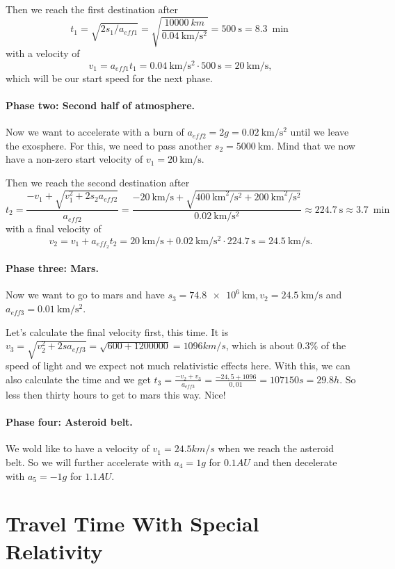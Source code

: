 \documentclass[10pt]{article}
\numberwithin{equation}{section}
\begin{document}
	Then we reach the first destination after	
	\begin{equation}
		t_1 = \sqrt{2s_1/a_{eff1}} = \sqrt{\frac{\SI{10000}{km}}{\SI{0.04}{\km\per\s\squared}}} = \SI{500}{\s} = \SI{8.3}{\min}	\end{equation}	
	with a velocity of
	\begin{equation}
		v_1=a_{eff1}t_1=\SI{0.04}{\km\per\s\squared} \cdot \SI{500}{\s} = \SI{20}{\km\per\s}, \end{equation}	
	which will be our start speed for the next phase.
	
	\paragraph{Phase two: Second half of atmosphere.}
	Now we want to accelerate with a burn of $a_{eff2}=2g=\SI{0.02}{\km\per\s\squared}$ until we leave the exosphere. For this, we need to pass another $s_2=\SI{5000}{\km}$. Mind that we now have a non-zero start velocity of $v_1 = \SI{20}{\km\per\s}$.
	
	Then we reach the second destination after
	\begin{equation}
		t_2 = \frac{-v_1+\sqrt{v^2_1+2s_2a_{eff2}}}{a_{eff2}} = \frac {\SI{-20}{\km\per\s}+\sqrt{\SI{400}{\km\squared\per\s\squared}+\SI{200}{\km\squared\per\s\squared}}} {\SI{0.02}{\km\per\s\squared}}
		\approx \SI{224.7}{\s} \approx \SI{3.7}{\min} \end{equation}
	with a final velocity of
	\begin{equation}
		v_2 = v_1 + a_{eff_2}t_2
		= \SI{20}{\km\per\s} + \SI{0.02}{\km\per\s\squared} \cdot \SI{224.7}{\s}
		= \SI{24.5}{\km\per\s}. \end{equation}
	
	\paragraph{Phase three: Mars.}	
	Now we want to go to mars and have $s_3 = \SI{74.8e+6}{\km}, v_2 = \SI{24.5}{\km\per\s}$ and $a_{eff3} = \SI{0.01}{\km\per\s\squared}$.
	
	Let's calculate the final velocity first, this time. It is $v_3 = \sqrt{v^2_2 + 2sa_{eff3}} = \sqrt{600 + 1 200 000} = 1096 km/s$, which is about $0.3 \%$ of the speed of light and we expect not much relativistic effects here. With this, we can also calculate the time and we get $t_3 = \frac{-v_2 + v_3}{a_{eff3}} = \frac{-24,5 + 1096}{0,01} = 107150 s = 29.8 h$. So less then thirty hours to get to mars this way. Nice!
	
	\paragraph{Phase four: Asteroid belt.}
	
	We wold like to have a velocity of $v_1 = 24.5 km/s$ when we reach the asteroid belt. So we will further accelerate with $a_4 = 1 g$ for $0.1 AU$ and then decelerate with $a_5 = -1 g$ for $1.1 AU$.	
	
	
	\section{Travel Time With Special Relativity}
\end{document}
